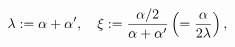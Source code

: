 \begin{equation}
  \lambda := \alpha+\alpha', \quad
  \xi := {\alpha/2 \over \alpha+\alpha'} \left( = {\alpha \over 2\lambda} \right) ,
\end{equation}

